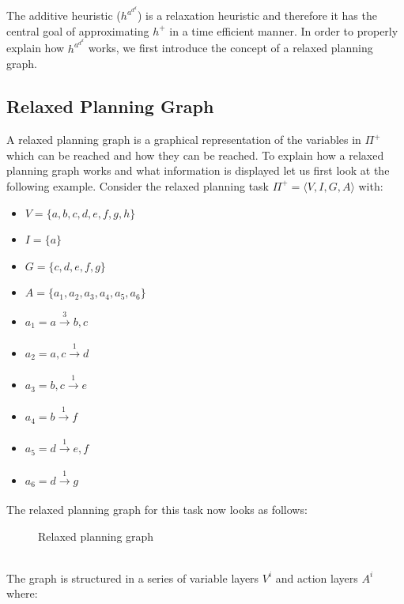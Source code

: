 The additive heuristic ($h^a^d^d$) is a relaxation heuristic and therefore it has the central goal of approximating $h^+$ in a time efficient manner. In order to properly explain how $h^a^d^d$ works, we first introduce the concept of a relaxed planning graph. 

\subsection{Relaxed Planning Graph}

A relaxed planning graph is a graphical representation of the variables in $\Pi^+$ which can be reached and how they can be reached. To explain how a relaxed planning graph works and what information is displayed let us first look at the following example. Consider the relaxed planning task $\Pi^+ = \langle V, I, G, A \rangle$ with:

\begin{itemize}
\setlength\itemsep{0em}
\item $V = \{a,b,c,d,e,f,g,h\}$
\item $I = \{a\}$
\item $G = \{c,d,e,f,g\}$ 
\item $A = \{a_1,a_2,a_3,a_4,a_5,a_6\}$
\item $a_1 = a \xrightarrow[\text{}]{\text{3}} b,c$
\item $a_2 = a,c \xrightarrow[\text{}]{\text{1}} d$
\item $a_3 = b,c \xrightarrow[\text{}]{\text{1}} e$
\item $a_4 = b \xrightarrow[\text{}]{\text{1}} f$
\item $a_5 = d \xrightarrow[\text{}]{\text{1}} e,f$
\item $a_6 = d \xrightarrow[\text{}]{\text{1}} g$
\end{itemize}
\newpage
The relaxed planning graph for this task now looks as follows:
\begin{figure}
\centering

\caption{Relaxed planning graph}
\label{fig:machine}
\end{figure}
\\The graph is structured in a series of variable layers $V^i$ and action layers $A^i$ where:

